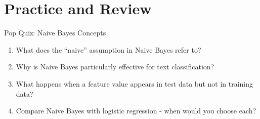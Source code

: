 \documentclass{beamer}
\begin{document}











\section{Practice and Review}

\begin{frame}{Pop Quiz: Naive Bayes Concepts}
\begin{enumerate}
\item What does the ``naive'' assumption in Naive Bayes refer to?
\pause
\item Why is Naive Bayes particularly effective for text classification?
\pause
\item What happens when a feature value appears in test data but not in training data?
\pause
\item Compare Naive Bayes with logistic regression - when would you choose each?
\end{enumerate}
\end{frame}
\end{document}
